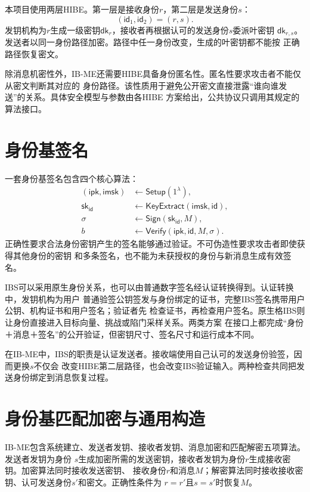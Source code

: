 本项目使用两层HIBE。第一层是接收身份$r$，第二层是发送身份$s$：
\[
  (\mathsf{id}_1,\mathsf{id}_2)=(r,s).
\]
发钥机构为$r$生成一级密钥$\mathsf{dk}_r$，接收者再根据认可的发送身份$s$委派叶密钥
$\mathsf{dk}_{r,s}$。发送者以同一身份路径加密。路径中任一身份改变，生成的叶密钥都不能按
正确路径恢复密文。

除消息机密性外，IB-ME还需要HIBE具备身份匿名性。匿名性要求攻击者不能仅从密文判断其对应的
身份路径。该性质用于避免公开密文直接泄露“谁向谁发送”的关系。具体安全模型与参数由各HIBE
方案给出，公共协议只调用其规定的算法接口。

\section{身份基签名}

一套身份基签名包含四个核心算法：
\[
\begin{aligned}
 (\mathsf{ipk},\mathsf{imsk})&\leftarrow\mathsf{Setup}(1^\lambda),\\
 \mathsf{sk}_{\mathsf{id}}&\leftarrow\mathsf{KeyExtract}(\mathsf{imsk},\mathsf{id}),\\
 \sigma&\leftarrow\mathsf{Sign}(\mathsf{sk}_{\mathsf{id}},M),\\
 b&\leftarrow\mathsf{Verify}(\mathsf{ipk},\mathsf{id},M,\sigma).
\end{aligned}
\]
正确性要求合法身份密钥产生的签名能够通过验证。不可伪造性要求攻击者即使获得其他身份的密钥
和多条签名，也不能为未获授权的身份与新消息生成有效签名。

IBS可以采用原生身份关系，也可以由普通数字签名经认证转换得到。认证转换中，发钥机构为用户
普通验签公钥签发与身份绑定的证书，完整IBS签名携带用户公钥、机构证书和用户签名；验证者先
检查证书，再检查用户签名。原生格IBS则让身份直接进入目标向量、挑战或陷门采样关系。两类方案
在接口上都完成“身份＋消息＋签名”的公开验证，但密钥尺寸、签名尺寸和运行成本不同。

在IB-ME中，IBS的职责是认证发送者。接收端使用自己认可的发送身份验签，因而更换$s$不仅会
改变HIBE第二层路径，也会改变IBS验证输入。两种检查共同把发送身份绑定到消息恢复过程。

\section{身份基匹配加密与通用构造}

IB-ME包含系统建立、发送者发钥、接收者发钥、消息加密和匹配解密五项算法。发送者发钥为身份
$s$生成加密所需的发送密钥，接收者发钥为身份$r$生成接收密钥。加密算法同时接收发送密钥、
接收身份$r$和消息$M$；解密算法同时接收接收密钥、认可发送身份$s'$和密文。正确性条件为
$r=r'$且$s=s'$时恢复$M$。

